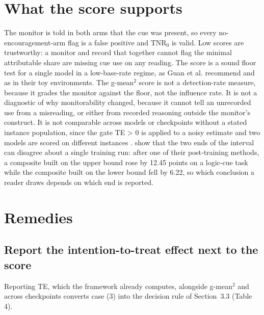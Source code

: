 \documentclass[11pt]{article}
\begin{document}
\section{What the score supports}
The monitor is told in both arms that the cue was present, so every no-encouragement-arm flag is a false positive and $\mathrm{TNR}_0$ is valid. Low scores are trustworthy: a monitor and record that together cannot flag the minimal attributable share are missing cue use on any reading. The score is a sound floor test for a single model in a low-base-rate regime, as Guan et al. recommend and as in their toy environments. The g-mean$^2$ score is not a detection-rate measure, because it grades the monitor against the floor, not the influence rate. It is not a diagnostic of why monitorability changed, because it cannot tell an unrecorded use from a misreading, or either from recorded reasoning outside the monitor's construct. It is not comparable across models or checkpoints without a stated instance population, since the gate TE > 0 is applied to a noisy estimate and two models are scored on different instances \citep{dilgren2026evaluating}. \citet{fu2026learning} show that the two ends of the interval can disagree about a single training run: after one of their post-training methods, a composite built on the upper bound rose by 12.45 points on a logic-cue task while the composite built on the lower bound fell by 6.22, so which conclusion a reader draws depends on which end is reported.

\section{Remedies}
\subsection{Report the intention-to-treat effect next to the score}
Reporting TE, which the framework already computes, alongside g-mean$^2$ and across checkpoints converts case (3) into the decision rule of Section~3.3 (Table 4).
\end{document}
